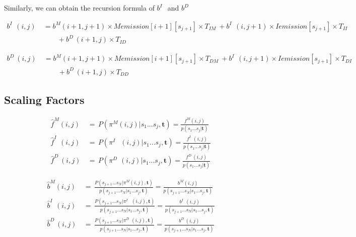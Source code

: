\documentclass[10pt]{article}
\begin{document}
    Similarly, we can obtain the recursion formula of $b^{I\;\;}$ and $b^{D\;}$

    \begin{equation}
    \begin{aligned}
      b^{I\;\;}(i, j) \
        &= b^M(i+1, j+1) \times Memission[i+1][s_{j+1}] \times T_{IM} \
          + b^{I\;\;}(i, j+1) \times Iemission[s_{j+1}] \times T_{II} \\
          &\qquad+ b^{D\;}(i+1, j) \times T_{ID}
    \end{aligned}
    \end{equation}

    \begin{equation}
    \begin{aligned}
      b^{D\;}(i, j) \
        &= b^M(i+1, j+1) \times Memission[i+1][s_{j+1}] \times T_{DM} \
          + b^{I\;\;}(i, j+1) \times Iemission[s_{j+1}] \times T_{DI} \\
          &\qquad+ b^{D\;}(i+1, j) \times T_{DD}
    \end{aligned}
    \end{equation}

  \subsection{Scaling Factors}

    \begin{equation}
    \begin{aligned}
      \widehat{f}^{M}(i, j) \,&=\, P(\pi^M(i, j) | s_1...s_j, \mathbf{t}) = \frac{f^{M}(i, j)}{p(s_1...s_j | \mathbf{t})} \\
      \widehat{f}^{I\;\;}(i, j) \,&=\, P(\pi^{I\;\;}\,\,(i, j) | s_1...s_j, \mathbf{t}) = \frac{f^{I\;\;}(i, j)}{p(s_1...s_j | \mathbf{t})}\\
      \widehat{f}^{D\;}(i, j) \,&=\, P(\pi^{D\;}\,(i, j) | s_1...s_j, \mathbf{t}) = \frac{f^{D\;}(i, j)}{p(s_1...s_j | \mathbf{t})}
    \end{aligned}
    \end{equation}

    \begin{equation}
    \begin{aligned}
      \widehat{b}^{M}(i, j) \,&=\, \frac{P(s_{j+1}...s_N | \pi^M(i, j), \mathbf{t})}{p(s_{j+1}...s_N | s_1...s_j, \mathbf{t})} = \frac{b^{M}(i, j)}{p(s_{j+1}...s_N | s_1...s_j, \mathbf{t})} \\
      \widehat{b}^{I\;\;}(i, j) \,&=\, \frac{P(s_{j+1}...s_N | \pi^{I\;\;}\,\,(i, j), \mathbf{t})}{p(s_{j+1}...s_N | s_1...s_j, \mathbf{t})} = \frac{b^{I\;\;}(i, j)}{p(s_{j+1}...s_N | s_1...s_j, \mathbf{t})} \\
      \widehat{b}^{D\;}(i, j) \,&=\, \frac{P(s_{j+1}...s_N | \pi^{D\;}\,(i, j), \mathbf{t})}{p(s_{j+1}...s_N | s_1...s_j, \mathbf{t})} = \frac{b^{D\;}(i, j)}{p(s_{j+1}...s_N | s_1...s_j, \mathbf{t})}
    \end{aligned}
    \end{equation}
\end{document}
